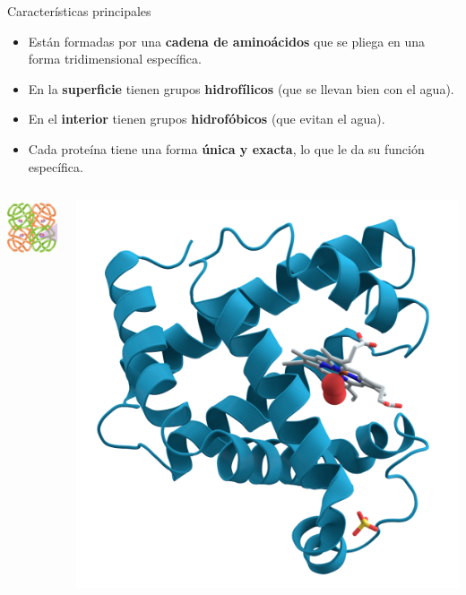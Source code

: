 \documentclass[
  ignorenonframetext,
]{beamer}
\providecommand{\tightlist}{%
  \setlength{\itemsep}{0pt}\setlength{\parskip}{0pt}}
\begin{document}
\begin{frame}{Características principales}
\label{caracteruxedsticas-principales}
\begin{itemize}
\tightlist
\item
  Están formadas por una \textbf{cadena de aminoácidos} que se pliega en
  una forma tridimensional específica.
\item
  En la \textbf{superficie} tienen grupos \textbf{hidrofílicos} (que se
  llevan bien con el agua).
\item
  En el \textbf{interior} tienen grupos \textbf{hidrofóbicos} (que
  evitan el agua).
\item
  Cada proteína tiene una forma \textbf{única y exacta}, lo que le da su
  función específica.
\end{itemize}

\begin{columns}[T]
\begin{column}{0.33\linewidth}
\includegraphics[width=0.7\linewidth,height=\textheight,keepaspectratio]{hemo.png}
\end{column}

\begin{column}{0.33\linewidth}
\includegraphics[width=0.7\linewidth,height=\textheight,keepaspectratio]{mioglobina.png}
\end{column}


\end{columns}
\end{frame}
\end{document}
